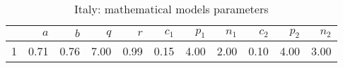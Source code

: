 \begin{table}[H]
\centering
\begin{tabular}{rrrrrrrrrrr}
  \hline
 & $a$ & $b$ & $q$ & $r$ & $c_1$ & $p_1$ & $n_1$ & $c_2$ & $p_2$ & $n_2$ \\ 
  \hline
1 & 0.71 & 0.76 & 7.00 & 0.99 & 0.15 & 4.00 & 2.00 & 0.10 & 4.00 & 3.00 \\ 
   \hline
\end{tabular}
\caption{Italy: mathematical models parameters} 
\label{fig:Italymathmodelpars}
\end{table}
